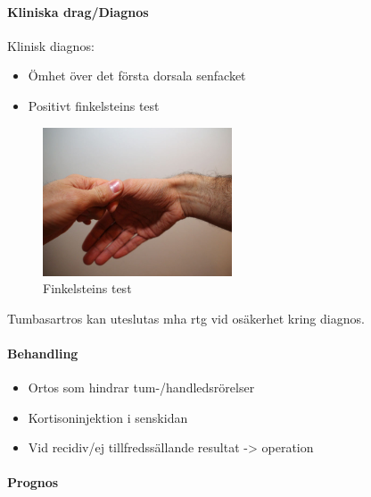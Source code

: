 \documentclass[
  letterpaper,
  DIV=11,
  numbers=noendperiod]{scrreport}
\let\oldparagraph\paragraph
\renewcommand{\paragraph}[1]{\oldparagraph{#1}\mbox{}}
\providecommand{\tightlist}{%
  \setlength{\itemsep}{0pt}\setlength{\parskip}{0pt}}\usepackage{longtable,booktabs,array}
\begin{document}
\hypertarget{kliniska-dragdiagnos-8}{%
\paragraph{Kliniska drag/Diagnos}\label{kliniska-dragdiagnos-8}}

Klinisk diagnos:

\begin{itemize}
\tightlist
\item
  Ömhet över det första dorsala senfacket
\item
  Positivt finkelsteins test
\end{itemize}

\begin{figure}

{\centering \includegraphics[width=0.5\textwidth,height=\textheight]{pics/Originaler_Finkelstein-Test.jpg}

}

\caption{Finkelsteins test}

\end{figure}

Tumbasartros kan uteslutas mha rtg vid osäkerhet kring diagnos.

\hypertarget{behandling-9}{%
\paragraph{Behandling}\label{behandling-9}}

\begin{itemize}
\tightlist
\item
  Ortos som hindrar tum-/handledsrörelser
\item
  Kortisoninjektion i senskidan
\item
  Vid recidiv/ej tillfredssällande resultat -\textgreater{} operation
\end{itemize}

\hypertarget{prognos-8}{%
\paragraph{Prognos}\label{prognos-8}}
\end{document}
